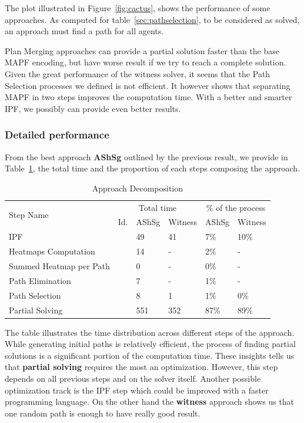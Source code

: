 The plot illustrated in Figure~\ref{fig:cactus}, shows the performance of some approaches. As computed for table~\ref{sec:pathselection}, to be considered as solved, an approach must find a path for all agents. 

Plan Merging approaches can provide a partial solution faster than the base MAPF encoding, but have worse result if we try to reach a complete solution. Given the great performance of the witness solver, it seems that the Path Selection processes we defined is not efficient. It however shows that separating MAPF in two steps improves the computation time. With a better and smarter IPF, we possibly can provide even better results.


\subsubsection{Detailed performance}

From the best approach \textbf{AShSg} outlined by the previous result, we provide in Table~\ref{tbl:approach_decomposition}, the total time and the proportion of each steps composing the approach.

\begin{table}[]
    \centering
    \caption{Approach Decomposition}\label{tbl:approach_decomposition}
    \begin{tabular}{@{}llllll@{}}
    \toprule
    \multicolumn{1}{l|}{\multirow{2}{*}{Step Name}} & \multicolumn{3}{c|}{Total time} & \multicolumn{2}{c}{\% of the process} \\ \cmidrule(l){2-6}  
    \multicolumn{1}{l|}{} & \multicolumn{1}{l|}{Id.} & \multicolumn{1}{c}{AShSg} & \multicolumn{1}{c|}{Witness} & \multicolumn{1}{c}{AShSg} & Witness \\ \midrule
    IPF & \cellcolor{lightgrey} & 49 & 41  &7\% &10\%  \\
    Heatmaps Computation & \cellcolor{lightgrey} & 14 &  - &2\% & - \\
    Summed Heatmap per Path & \cellcolor{lightgrey} & 0 &  - &0\% & - \\
    Path Elimination & \cellcolor{lightgrey} & 7 &  - &1\% & - \\
    Path Selection & \cellcolor{lightgrey} & 8 & 1  &1\% &0\%  \\
    Partial Solving & \cellcolor{lightgrey} & 551 & 352  &87\% &89\%  \\
    \end{tabular}
    \end{table}

    
The table illustrates the time distribution across different steps of the approach. While generating initial paths is relatively efficient, the process of finding partial solutions is a significant portion of the computation time. These insights tells us that  \textbf{partial solving} requires the most an optimization. However, this step depends on all previous steps and on the solver itself. Another possible optimization track is the IPF step which could be improved with a faster programming language. On the other hand the \textbf{witness} approach shows us that one random path is enough to have really good result. 



